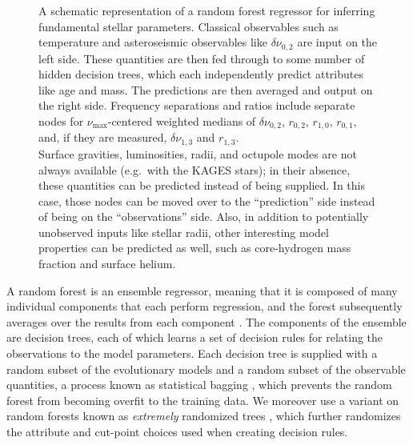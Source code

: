 \documentclass[manuscript]{aastex}
\begin{document}
\begin{figure}
    \centering
    
    \caption{A schematic representation of a random forest regressor for inferring fundamental stellar parameters. Classical observables such as temperature and asteroseismic observables like $\delta\nu_{0,2}$ are input on the left side. These quantities are then fed through to some number of hidden decision trees, which each independently predict attributes like age and mass. The predictions are then averaged and output on the right side. Frequency separations and ratios include separate nodes for $\nu_{\max}$-centered weighted medians of $\delta\nu_{0,2}$, $r_{0,2}$, $r_{1,0}$, $r_{0,1}$, and, if they are measured, $\delta\nu_{1,3}$ and $r_{1,3}$.\\
    Surface gravities, luminosities, radii, and octupole modes are not always available (e.g.~with the KAGES stars); in their absence, these quantities can be predicted instead of being supplied. In this case, those nodes can be moved over to the ``prediction'' side instead of being on the ``observations'' side. Also, in addition to potentially unobserved inputs like stellar radii, other interesting model properties can be predicted as well, such as core-hydrogen mass fraction and surface helium. }
    \label{fig:rf}
\end{figure}

A random forest is an ensemble regressor, meaning that it is composed of many individual components that each perform regression, and the forest subsequently averages over the results from each component \citep{breiman2001random}. The components of the ensemble are decision trees, each of which learns a set of decision rules for relating the observations to the model parameters. Each decision tree is supplied with a random subset of the evolutionary models and a random subset of the observable quantities, a process known as statistical bagging \citep[see section 8.7 of][]{hastie2005elements}, which prevents the random forest from becoming overfit to the training data. We moreover use a variant on random forests known as \emph{extremely} randomized trees \citep{geurts2006extremely}, which further randomizes the attribute and cut-point choices used when creating decision rules. 
\end{document}
